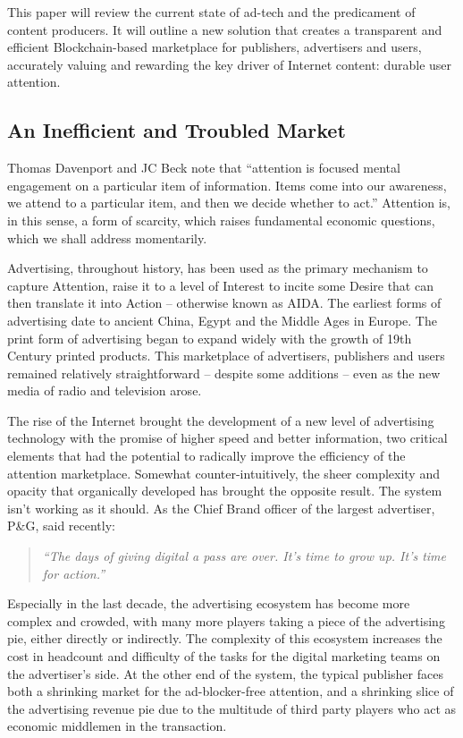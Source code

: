 \documentclass[11pt]{article}
\begin{document}
This paper will review the current state of ad-tech and the predicament of content producers. It will outline a new solution that creates a transparent and efficient Blockchain-based marketplace for publishers, advertisers and users, accurately valuing and rewarding the key driver of Internet content: durable user attention. 
\subsection{An Inefficient and Troubled Market}
\label{sec-3-1}

Thomas Davenport and JC Beck note that “attention is focused mental engagement on a particular item of information. Items come into our awareness, we attend to a particular item, and then we decide whether to act.”\cite{2} Attention is, in this sense, a form of scarcity, which raises fundamental economic questions, which we shall address momentarily.
 
Advertising, throughout history, has been used as the primary mechanism to capture Attention, raise it to a level of Interest to incite some Desire that can then translate it into Action -- otherwise known as AIDA.\cite{3} The earliest forms of advertising date to ancient China, Egypt and the Middle Ages in Europe. The print form of advertising began to expand widely with the growth of 19th Century printed products. This marketplace of advertisers, publishers and users remained relatively straightforward -- despite some additions -- even as the new media of radio and television arose. 

The rise of the Internet brought the development of a new level of advertising technology with the promise of higher speed and better information, two critical elements that had the potential to radically improve the efficiency of the attention marketplace. Somewhat counter-intuitively, the sheer complexity and opacity that organically developed has brought the opposite result. The system isn’t working as it should. As the Chief Brand officer of the largest advertiser, P\&G, said recently: \begin{quote}\textit{``The days of giving digital a pass are over. It's time to grow up. It's time for action.''}\cite{4}\end{quote}

Especially in the last decade, the advertising ecosystem has become more complex and crowded, with many more players taking a piece of the advertising pie, either directly or indirectly. The complexity of this ecosystem increases the cost in headcount and difficulty of the tasks for the digital marketing teams on the advertiser's side. At the other end of the system, the typical publisher faces both a shrinking market for the ad-blocker-free attention, and a shrinking slice of the advertising revenue pie due to the multitude of third party players who act as economic middlemen in the transaction. 
\end{document}
